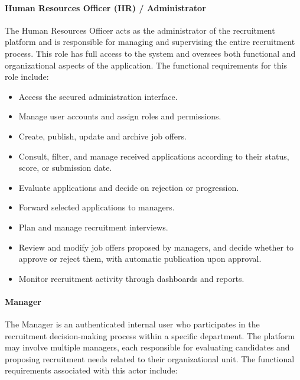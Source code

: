 \paragraph*{Human Resources Officer (HR) / Administrator}

The Human Resources Officer acts as the administrator of the recruitment platform and is responsible for managing and supervising the entire recruitment process. This role has full access to the system and oversees both functional and organizational aspects of the application. The functional requirements for this role include:

\begin{itemize}[label={-}]
    \item Access the secured administration interface.
    \item Manage user accounts and assign roles and permissions.
    \item Create, publish, update and archive job offers.
    \item Consult, filter, and manage received applications according to their status, score, or submission date.
    \item Evaluate applications and decide on rejection or progression.
    \item Forward selected applications to managers.
    \item Plan and manage recruitment interviews.
    \item Review and modify job offers proposed by managers, and decide whether to approve or reject them, with automatic publication upon approval.
    \item Monitor recruitment activity through dashboards and reports.
\end{itemize}

\paragraph*{Manager}

The Manager is an authenticated internal user who participates in the recruitment decision-making process within a specific department. The platform may involve multiple managers, each responsible for evaluating candidates and proposing recruitment needs related to their organizational unit. The functional requirements associated with this actor include:

